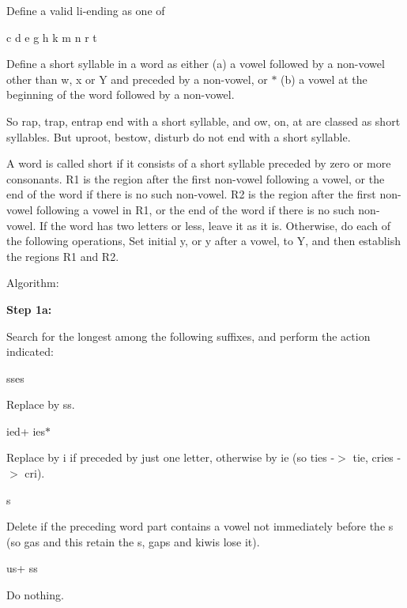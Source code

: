 Define a valid li-\/ending as one of
\begin{DoxyItemize}
\item c d e g h k m n r t
\end{DoxyItemize}

Define a short syllable in a word as either (a) a vowel followed by a non-\/vowel other than w, x or Y and preceded by a non-\/vowel, or $\ast$ (b) a vowel at the beginning of the word followed by a non-\/vowel.

So rap, trap, entrap end with a short syllable, and ow, on, at are classed as short syllables. But uproot, bestow, disturb do not end with a short syllable.

A word is called short if it consists of a short syllable preceded by zero or more consonants. R1 is the region after the first non-\/vowel following a vowel, or the end of the word if there is no such non-\/vowel. R2 is the region after the first non-\/vowel following a vowel in R1, or the end of the word if there is no such non-\/vowel. If the word has two letters or less, leave it as it is. Otherwise, do each of the following operations, Set initial y, or y after a vowel, to Y, and then establish the regions R1 and R2.

\begin{DoxyParagraph}{Algorithm\-:}

\end{DoxyParagraph}
{\bfseries Step 1a\-:}

Search for the longest among the following suffixes, and perform the action indicated\-:
\begin{DoxyItemize}
\item sses
\begin{DoxyItemize}
\item Replace by ss.
\end{DoxyItemize}
\item ied+ ies$\ast$
\begin{DoxyItemize}
\item Replace by i if preceded by just one letter, otherwise by ie (so ties -\/$>$ tie, cries -\/$>$ cri).
\end{DoxyItemize}
\item s
\begin{DoxyItemize}
\item Delete if the preceding word part contains a vowel not immediately before the s (so gas and this retain the s, gaps and kiwis lose it).
\end{DoxyItemize}
\item us+ ss
\begin{DoxyItemize}
\item Do nothing.
\end{DoxyItemize}
\end{DoxyItemize}

